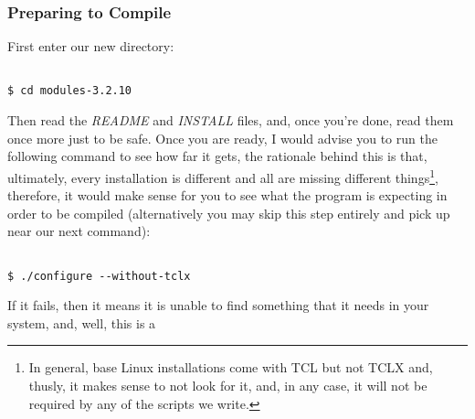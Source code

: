 \documentclass[]{article}
\begin{document}
                                                                             \subsubsection{Preparing to Compile}
                                                                             First enter our new directory:
                                                                             \begin{lstlisting}
                                                                             $ cd modules-3.2.10
                                                                             \end{lstlisting}
                                                                             Then read the \textit{README} and \textit{INSTALL} files, and, once you're done, read them once more just to 
                                                                             be safe. Once you are ready, I would advise you to run the following command to see how far it gets, the 
                                                                             rationale behind this is that, ultimately, every installation is different and all are missing different 
                                                                             things\footnote{In general, base Linux installations come with TCL but not TCLX and, thusly, it makes sense 
                                                                                 to not look for it, and, in any case, it will not be required by any of the scripts we write.}, therefore, 
                                                                                 it would make sense for you to see what the program is expecting in order to be compiled (alternatively you 
                                                                                         may skip this step entirely and pick up near our next command):
                                                                                     \begin{lstlisting}
                                                                                     $ ./configure --without-tclx
                                                                                     \end{lstlisting}
                                                                                     If it fails, then it means it is unable to find something that it needs in your system, and, well, this is a 
\end{document}

